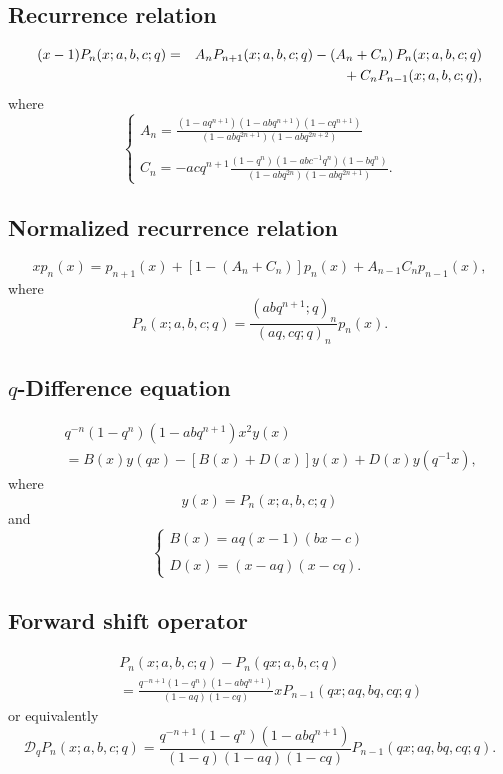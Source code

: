 \documentclass[envcountchap,graybox]{svmono}
\newcommand{\mathindent}{\hspace{7.5mm}}
\begin{document}
\subsection*{Recurrence relation}
\begin{eqnarray}
\label{RecBigqJacobi}
(x-1)P_n(x;a,b,c;q)&=&A_nP_{n+1}(x;a,b,c;q)-\left(A_n+C_n\right)P_n(x;a,b,c;q)\nonumber\\
& &{}\mathindent{}+C_nP_{n-1}(x;a,b,c;q),
\end{eqnarray}
where
$$\left\{\begin{array}{l}
\displaystyle A_n=\frac{(1-aq^{n+1})(1-abq^{n+1})(1-cq^{n+1})}{(1-abq^{2n+1})(1-abq^{2n+2})}\\
\\
\displaystyle C_n=-acq^{n+1}\frac{(1-q^n)(1-abc^{-1}q^n)(1-bq^n)}{(1-abq^{2n})(1-abq^{2n+1})}.
\end{array}\right.$$

\subsection*{Normalized recurrence relation}
\begin{equation}
\label{NormRecBigqJacobi}
xp_n(x)=p_{n+1}(x)+\left[1-(A_n+C_n)\right]p_n(x)+A_{n-1}C_np_{n-1}(x),
\end{equation}
where
$$P_n(x;a,b,c;q)=\frac{(abq^{n+1};q)_n}{(aq,cq;q)_n}p_n(x).$$

\subsection*{$q$-Difference equation}
\begin{eqnarray}
\label{dvBigqJacobi}
& &q^{-n}(1-q^n)(1-abq^{n+1})x^2y(x)\nonumber\\
& &{}=B(x)y(qx)-\left[B(x)+D(x)\right]y(x)+D(x)y(q^{-1}x),
\end{eqnarray}
where
$$y(x)=P_n(x;a,b,c;q)$$
and
$$\left\{\begin{array}{l}\displaystyle B(x)=aq(x-1)(bx-c)\\
\\
\displaystyle D(x)=(x-aq)(x-cq).\end{array}\right.$$

\subsection*{Forward shift operator}
\begin{eqnarray}
\label{shift1BigqJacobiI}
& &P_n(x;a,b,c;q)-P_n(qx;a,b,c;q)\nonumber\\
& &{}=\frac{q^{-n+1}(1-q^n)(1-abq^{n+1})}{(1-aq)(1-cq)}xP_{n-1}(qx;aq,bq,cq;q)
\end{eqnarray}
or equivalently
\begin{equation}
\label{shift1BigqJacobiII}
\mathcal{D}_qP_n(x;a,b,c;q)=\frac{q^{-n+1}(1-q^n)(1-abq^{n+1})}
{(1-q)(1-aq)(1-cq)}P_{n-1}(qx;aq,bq,cq;q).
\end{equation}
\end{document}
